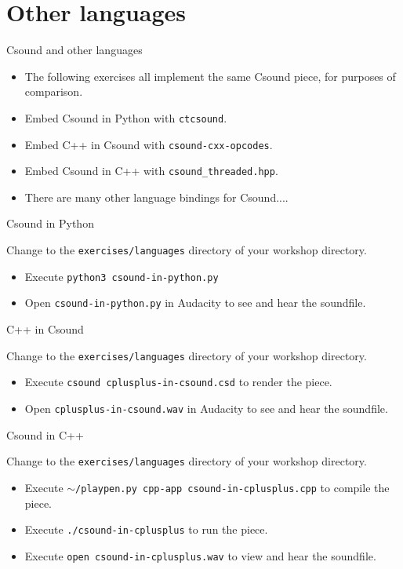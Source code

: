 \documentclass{beamer}
\begin{document}
\section{Other languages}
\begin{frame}{Csound and other languages}
\begin{itemize}
\item The following exercises all implement the same Csound piece, for purposes of comparison.
\item Embed Csound in Python with \texttt{ctcsound}.
\item Embed C++ in Csound with \texttt{csound-cxx-opcodes}.
\item Embed Csound in C++ with \texttt{csound\_threaded.hpp}.
\item There are many other language bindings for Csound....
\end{itemize}
\end{frame}

\begin{frame}{Csound in Python}
\begin{example}
Change to the \texttt{exercises/languages} directory of your workshop directory.
\begin{itemize}
\item Execute \texttt{python3 csound-in-python.py}
\item Open \texttt{csound-in-python.py} in Audacity to see and hear the soundfile.
\end{itemize}
\end{example}
\end{frame}

\begin{frame}{C++ in Csound}
\begin{example}
Change to the \texttt{exercises/languages} directory of your workshop directory.
\begin{itemize}
\item Execute \texttt{csound cplusplus-in-csound.csd} to render the piece.
\item Open \texttt{cplusplus-in-csound.wav} in Audacity to see and hear the soundfile.
\end{itemize}
\end{example}
\end{frame}

\begin{frame}{Csound in C++}
\begin{example}
Change to the \texttt{exercises/languages} directory of your workshop directory.
\begin{itemize}
\item Execute \texttt{$\sim$/playpen.py cpp-app csound-in-cplusplus.cpp} to compile the piece.
\item Execute \texttt{./csound-in-cplusplus} to run the piece.
\item Execute \texttt{open csound-in-cplusplus.wav} to view and hear the soundfile.
\end{itemize}
\end{example}
\end{frame}
\end{document}
